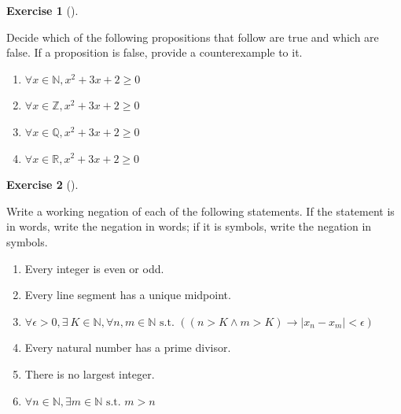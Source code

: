 \documentclass[
  letterpaper,
  10pt,
  reqno,
  twopage,
  openany]{book}
\providecommand{\tightlist}{%
  \setlength{\itemsep}{0pt}\setlength{\parskip}{0pt}}\usepackage{longtable,booktabs,array}
\theoremstyle{plain}
\theoremstyle{definition}
\newtheorem{exercise}{Exercise}[chapter]
\theoremstyle{definition}
\theoremstyle{definition}
\theoremstyle{plain}
\theoremstyle{plain}
\theoremstyle{remark}
\begin{document}
\leavevmode{}%
\begin{exercise}[]\label{exr-true-false-counterexample}

Decide which of the following propositions that follow are true and
which are false. If a proposition is false, provide a counterexample to
it.

\begin{enumerate}
\def\labelenumi{\arabic{enumi}.}
\tightlist
\item
  \(\forall x \in \mathbb{N}, x^2+3x+2\geq 0\)
\item
  \(\forall x \in \mathbb{Z}, x^2+3x+2\geq 0\)
\item
  \(\forall x \in \mathbb{Q}, x^2+3x+2\geq 0\)
\item
  \(\forall x \in \mathbb{R}, x^2+3x+2\geq 0\)
\end{enumerate}

\end{exercise}

\leavevmode{}%
\begin{exercise}[]\label{exr-working-negation-in-words}

Write a working negation of each of the following statements. If the
statement is in words, write the negation in words; if it is symbols,
write the negation in symbols.

\begin{enumerate}
\def\labelenumi{\arabic{enumi}.}
\tightlist
\item
  Every integer is even or odd.
\item
  Every line segment has a unique midpoint.
\item
  \(\forall \epsilon>0, \exists \ K\in \mathbb{N}, \forall n,m\in \mathbb{N} \text{ s.t. } ((n>K \land m>K)\rightarrow |x_n -x_m|<\epsilon)\)
\item
  Every natural number has a prime divisor.
\item
  There is no largest integer.
\item
  \(\forall n\in \mathbb{N}, \exists m\in \mathbb{N} \text{ s.t. } m>n\)
\end{enumerate}

\end{exercise}
\end{document}
